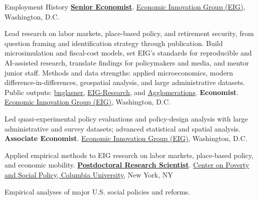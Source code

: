 \begin{rubric}{Employment History}
%
    \textbf{\href{https://eig.org/about-us/executive-team-staff/ben-glasner/}{Senior Economist}}. \href{https://eig.org/}{Economic Innovation Group (EIG)}, Washington, D.C.
    \par Lead research on labor markets, place-based policy, and retirement security, from question framing and identification strategy through publication. Build microsimulation and fiscal-cost models, set EIG's standards for reproducible and AI-assisted research, translate findings for policymakers and media, and mentor junior staff. Methods and data strengths: applied microeconomics, modern difference-in-differences, geospatial analysis, and large administrative datasets. Public outputs: \href{https://github.com/bnglasner}{bnglasner}, \href{https://github.com/EIG-Research}{EIG-Research}, and \href{https://agglomerations.eig.org/}{Agglomerations}.
%
    \textbf{Economist}. \href{https://eig.org/}{Economic Innovation Group (EIG)}, Washington, D.C.
    \par Led quasi-experimental policy evaluations and policy-design analysis with large administrative and survey datasets; advanced statistical and spatial analysis.
%
    \textbf{Associate Economist}. \href{https://eig.org/}{Economic Innovation Group (EIG)}, Washington, D.C.
    \par Applied empirical methods to EIG research on labor markets, place-based policy, and economic mobility.
\entry*[2021 - 2022]%
    \textbf{\href{https://povertycenter.columbia.edu/people}{Postdoctoral Research Scientist}}. \href{https://povertycenter.columbia.edu/people}{Center on Poverty and Social Policy, Columbia University}, New York, NY
    \par Empirical analyses of major U.S. social policies and reforms.
\end{rubric}
